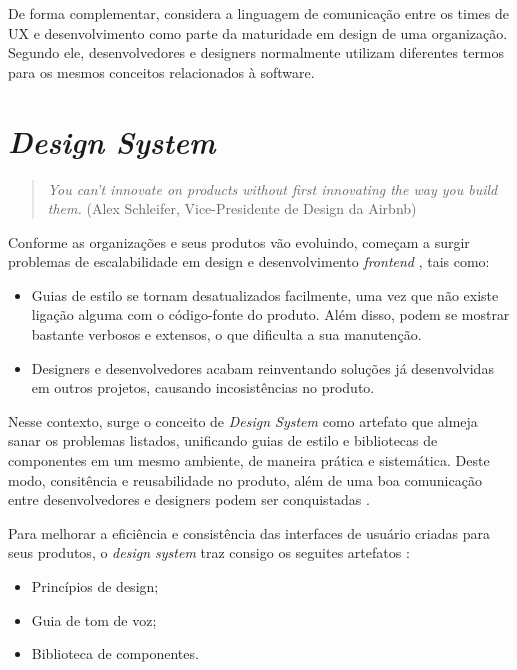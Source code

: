 De forma complementar,  considera a linguagem de comunicação entre os times de UX e desenvolvimento como parte da maturidade em design de uma organização. Segundo ele, desenvolvedores e designers normalmente utilizam diferentes termos para os mesmos conceitos relacionados à software.

\section{\textit{Design System}}
\label{sec:designSystem}

\begin{quote}{\textit{You can’t innovate on products without first innovating the way you build them.}}
	(Alex Schleifer, Vice-Presidente de Design da Airbnb)
\end{quote}
 
Conforme as organizações e seus produtos vão evoluindo, começam a surgir problemas de escalabilidade em design e desenvolvimento \textit{frontend} \cite{curtis2010modular}, tais como:

\begin{itemize}
  \item Guias de estilo se tornam desatualizados facilmente, uma vez que não existe ligação alguma com o código-fonte do produto. Além disso, podem se mostrar bastante verbosos e extensos, o que dificulta a sua manutenção.
  \item Designers e desenvolvedores acabam reinventando soluções já desenvolvidas em outros projetos, causando incosistências no produto.
\end{itemize}

Nesse contexto, surge o conceito de \textit{Design System} como artefato que almeja sanar os problemas listados, unificando guias de estilo e bibliotecas de componentes em um mesmo ambiente, de maneira prática e sistemática. Deste modo, consitência e reusabilidade no produto, além de uma boa comunicação entre desenvolvedores e designers podem ser conquistadas \cite{curtis2010modular}.

Para melhorar a eficiência e consistência das interfaces de usuário criadas para seus produtos, o \textit{design system} traz consigo os seguites artefatos \cite{ruissalo2018operating}:

\begin{itemize}
  \item Princípios de design;
  \item Guia de tom de voz;
  \item Biblioteca de componentes.
\end{itemize}

